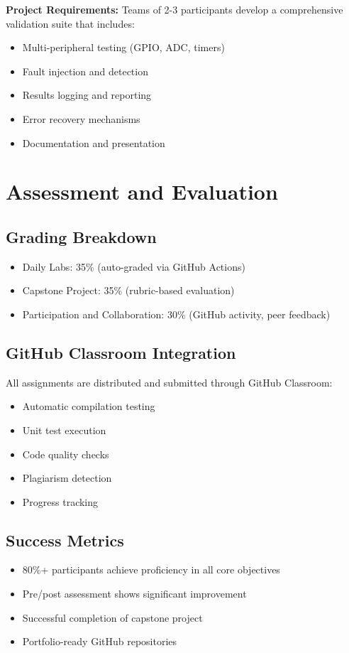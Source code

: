 \documentclass[11pt,a4paper]{article}
\begin{document}
\textbf{Project Requirements:}
Teams of 2-3 participants develop a comprehensive validation suite that includes:
\begin{itemize}
    \item Multi-peripheral testing (GPIO, ADC, timers)
    \item Fault injection and detection
    \item Results logging and reporting
    \item Error recovery mechanisms
    \item Documentation and presentation
\end{itemize}

\section{Assessment and Evaluation}

\subsection{Grading Breakdown}
\begin{itemize}
    \item Daily Labs: 35\% (auto-graded via GitHub Actions)
    \item Capstone Project: 35\% (rubric-based evaluation)
    \item Participation and Collaboration: 30\% (GitHub activity, peer feedback)
\end{itemize}

\subsection{GitHub Classroom Integration}
All assignments are distributed and submitted through GitHub Classroom:
\begin{itemize}
    \item Automatic compilation testing
    \item Unit test execution
    \item Code quality checks
    \item Plagiarism detection
    \item Progress tracking
\end{itemize}

\subsection{Success Metrics}
\begin{itemize}
    \item 80\%+ participants achieve proficiency in all core objectives
    \item Pre/post assessment shows significant improvement
    \item Successful completion of capstone project
    \item Portfolio-ready GitHub repositories
\end{itemize}
\end{document}
